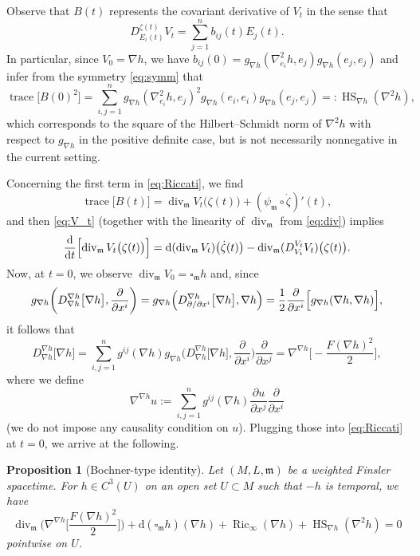 \documentclass[a4paper,11pt]{article}
\numberwithin{equation}{section}
\theoremstyle{definition}
\theoremstyle{plain}
\newtheorem{proposition}[definition]{Proposition}
\newcommand{\del}{\partial}
\newcommand{\dd}{\mathrm{d}}
\newcommand{\fm}{\ensuremath{\mathfrak{m}}}
\def\div{\mathop{\mathrm{div}}\nolimits}
\def\Ric{\mathop{\mathrm{Ric}}\nolimits}
\def\trace{\mathop{\mathrm{trace}}\nolimits}
\def\HS{\mathop{\mathrm{HS}}\nolimits}
\begin{document}
Observe that $B(t)$ represents the covariant derivative of $V_t$ in the sense that
\[ D^{\dot{\zeta}(t)}_{E_i(t)} V_t =\sum_{j=1}^n b_{ij}(t)E_j(t). \]
In particular, since $V_0=\nabla h$, we have $b_{ij}(0) =g_{\nabla h}(\nabla^2_{e_i}h,e_j) g_{\nabla h}(e_j,e_j)$ and infer from the symmetry \eqref{eq:symm} that
\begin{equation}\label{eq:q-HS}
\trace\bigl[ B(0)^2 \bigr]
=\sum_{i,j=1}^n g_{\nabla h}(\nabla^2_{e_i} h,e_j)^2 g_{\nabla h}(e_i,e_i) g_{\nabla h}(e_j,e_j)
=: \HS_{\nabla h}(\nabla^2 h),
\end{equation}
which corresponds to the square of the Hilbert--Schmidt norm of $\nabla^2 h$ with respect to $g_{\nabla h}$ in the positive definite case, but is not necessarily nonnegative in the current setting.

Concerning the first term in \eqref{eq:Riccati}, we find
\[ \trace \bigl[ B(t) \bigr] =\div_\fm V_t\bigl( \zeta(t) \bigr) +(\psi_\fm \circ \dot{\zeta})'(t), \]
and then \eqref{eq:V_t} (together with the linearity of $\div_\fm$ from \eqref{eq:div}) implies
\[ \frac{\dd}{\dd t} \Bigl[ \div_\fm V_t\bigl( \zeta(t) \bigr) \Bigr]
=\dd(\div_\fm V_t)\bigl( \dot{\zeta}(t) \bigr) -\div_\fm (D^{V_t}_{V_t} V_t)\bigl( \zeta(t) \bigr). \]
Now, at $t=0$, we observe $\div_\fm V_0 =\square_\fm h$ and, since
\[ g_{\nabla h}\biggl( D^{\nabla h}_{\nabla h} \bigl[ \nabla h \bigr],\frac{\del}{\del x^i} \biggr)
=g_{\nabla h}\Bigl( D^{\nabla h}_{\del /\del x^i} \bigl[ \nabla h \bigr],\nabla h \Bigr)
=\frac{1}{2} \frac{\del}{\del x^i} \Bigl[ g_{\nabla h}(\nabla h,\nabla h) \Bigr], \]
it follows that
\[ D^{\nabla h}_{\nabla h} \bigl[ \nabla h \bigr]
= \sum_{i,j=1}^n g^{ij}(\nabla h) g_{\nabla h}\biggl( D^{\nabla h}_{\nabla h} \bigl[ \nabla h \bigr],\frac{\del}{\del x^i} \biggr) \frac{\del}{\del x^j}
= \nabla^{\nabla h} \biggl[ -\frac{F(\nabla h)^2}{2} \biggr], \]
where we define
\[ \nabla^{\nabla h} u :=\sum_{i,j=1}^n g^{ij}(\nabla h) \frac{\del u}{\del x^j} \frac{\del }{\del x^i} \]
(we do not impose any causality condition on $u$).
Plugging those into \eqref{eq:Riccati} at $t=0$, we arrive at the following.

\begin{proposition}[Bochner-type identity]\label{pr:Boch}
Let $(M,L,\fm)$ be a weighted Finsler spacetime.
For $h \in C^3(U)$ on an open set $U \subset M$ such that $-h$ is temporal, we have
\begin{equation}\label{eq:Boch}
\div_\fm \biggl( \nabla^{\nabla h} \biggl[ \frac{F(\nabla h)^2}{2} \biggr] \biggr)
+\dd(\square_\fm h)(\nabla h) +\Ric_\infty (\nabla h) +\HS_{\nabla h}(\nabla^2 h) =0
\end{equation}
pointwise on $U$.
\end{proposition}
\end{document}
